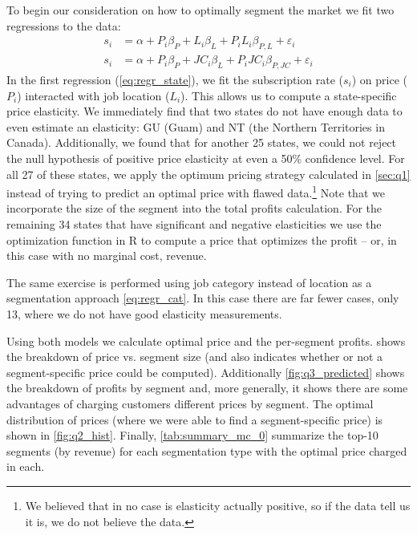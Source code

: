 \section{} \label{sec:q2} %
To begin our consideration on how to optimally segment the market we fit two regressions to the data:
\begin{align}
s_i &= \alpha +  P_i \beta_P + L_i \beta_L + P_i L_i \beta_{P,L} + \varepsilon_i \label{eq:regr_state} \\
s_i &= \alpha +  P_i \beta_P + JC_i \beta_L + P_i JC_i \beta_{P,JC} + \varepsilon_i \label{eq:regr_cat}
\end{align}
In the first regression (\vref{eq:regr_state}), we fit the subscription rate ($s_i$) on price ($P_i$) interacted with job location ($L_i$). This allows us to compute a state-specific price elasticity. We immediately find that two states do not have enough data to even estimate an elasticity: GU (Guam) and NT (the Northern Territories in Canada).  Additionally, we found that for another 25 states, we could not reject the null hypothesis of positive price elasticity at even a 50\% confidence level. For all 27 of these states, we apply the optimum pricing strategy calculated in \cref{sec:q1} instead of trying to predict an optimal price with flawed data.\footnote{We believed that in no case is elasticity actually positive, so if the data tell us it is, we do not believe the data.} Note that we incorporate the size of the segment into the total profits calculation.  For the remaining 34 states that have significant and negative elasticities we use the optimization function in R to compute a price that optimizes the profit -- or, in this case with no marginal cost, revenue.

The same exercise is performed using job category instead of location as a segmentation approach \vref{eq:regr_cat}.  In this case there are far fewer cases, only 13, where we do not have good elasticity measurements.

Using both models we calculate optimal price and the per-segment profits.   shows the breakdown of price vs. segment size (and also indicates whether or not a segment-specific price could be computed).  Additionally \vref{fig:q3_predicted} shows the breakdown of profits by segment and, more generally, it shows there are some advantages of charging customers different prices by segment.  The optimal distribution of prices (where we were able to find a segment-specific price) is shown in \vref{fig:q2_hist}.  Finally, \vref{tab:summary_mc_0} summarize the top-10 segments (by revenue) for each segmentation type with the optimal price charged in each.

